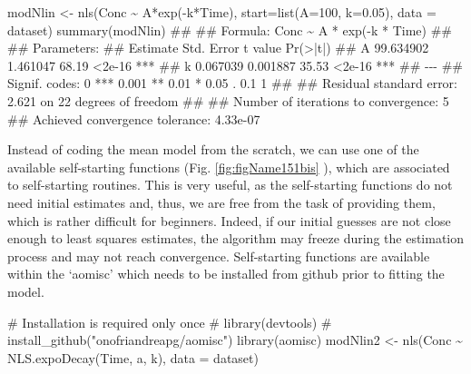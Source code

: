 \documentclass[a4paper,12pt,oneside]{book}
\newenvironment{Shaded}{\begin{snugshade}}{\end{snugshade}}
\newcommand{\DecValTok}[1]{#1}
\newcommand{\FloatTok}[1]{#1}
\newcommand{\SpecialCharTok}[1]{#1}
\newcommand{\CommentTok}[1]{#1}
\newcommand{\DocumentationTok}[1]{#1}
\newcommand{\OtherTok}[1]{#1}
\newcommand{\FunctionTok}[1]{#1}
\newcommand{\AttributeTok}[1]{#1}
\newcommand{\NormalTok}[1]{#1}
\begin{document}
\begin{Shaded}
\begin{Highlighting}[]
\NormalTok{modNlin }\OtherTok{\textless{}{-}} \FunctionTok{nls}\NormalTok{(Conc }\SpecialCharTok{\textasciitilde{}}\NormalTok{ A}\SpecialCharTok{*}\FunctionTok{exp}\NormalTok{(}\SpecialCharTok{{-}}\NormalTok{k}\SpecialCharTok{*}\NormalTok{Time), }
               \AttributeTok{start=}\FunctionTok{list}\NormalTok{(}\AttributeTok{A=}\DecValTok{100}\NormalTok{, }\AttributeTok{k=}\FloatTok{0.05}\NormalTok{), }
               \AttributeTok{data =}\NormalTok{ dataset)}
\FunctionTok{summary}\NormalTok{(modNlin)}
\DocumentationTok{\#\# }
\DocumentationTok{\#\# Formula: Conc \textasciitilde{} A * exp({-}k * Time)}
\DocumentationTok{\#\# }
\DocumentationTok{\#\# Parameters:}
\DocumentationTok{\#\#    Estimate Std. Error t value Pr(\textgreater{}|t|)    }
\DocumentationTok{\#\# A 99.634902   1.461047   68.19   \textless{}2e{-}16 ***}
\DocumentationTok{\#\# k  0.067039   0.001887   35.53   \textless{}2e{-}16 ***}
\DocumentationTok{\#\# {-}{-}{-}}
\DocumentationTok{\#\# Signif. codes:  0 \textquotesingle{}***\textquotesingle{} 0.001 \textquotesingle{}**\textquotesingle{} 0.01 \textquotesingle{}*\textquotesingle{} 0.05 \textquotesingle{}.\textquotesingle{} 0.1 \textquotesingle{} \textquotesingle{} 1}
\DocumentationTok{\#\# }
\DocumentationTok{\#\# Residual standard error: 2.621 on 22 degrees of freedom}
\DocumentationTok{\#\# }
\DocumentationTok{\#\# Number of iterations to convergence: 5 }
\DocumentationTok{\#\# Achieved convergence tolerance: 4.33e{-}07}
\end{Highlighting}
\end{Shaded}

Instead of coding the mean model from the scratch, we can use one of the available self-starting functions (Fig. \ref{fig:figName151bis} ), which are associated to self-starting routines. This is very useful, as the self-starting functions do not need initial estimates and, thus, we are free from the task of providing them, which is rather difficult for beginners. Indeed, if our initial guesses are not close enough to least squares estimates, the algorithm may freeze during the estimation process and may not reach convergence. Self-starting functions are available within the `aomisc' which needs to be installed from github prior to fitting the model.

\begin{Shaded}
\begin{Highlighting}[]
\CommentTok{\# Installation is required only once}
\CommentTok{\# library(devtools)}
\CommentTok{\# install\_github("onofriandreapg/aomisc")}
\FunctionTok{library}\NormalTok{(aomisc)}
\NormalTok{modNlin2 }\OtherTok{\textless{}{-}} \FunctionTok{nls}\NormalTok{(Conc }\SpecialCharTok{\textasciitilde{}} \FunctionTok{NLS.expoDecay}\NormalTok{(Time, a, k),}
               \AttributeTok{data =}\NormalTok{ dataset)}
\end{Highlighting}
\end{Shaded}
\end{document}
